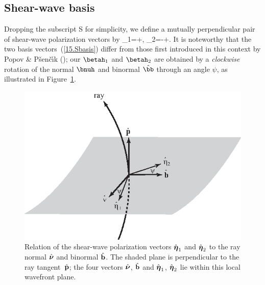 \renewcommand{\thesubsection}{$\!\!\!\raise1.3ex\hbox{$\star$}\!\!$
\arabic{chapter}.\arabic{section}.\arabic{subsection}}
\subsection{Shear-wave basis}
%
%
\renewcommand{\thesubsection}{\arabic{chapter}.\arabic{section}.\arabic{subsection}}

Dropping the subscript S for simplicity, we define a mutually
perpendicular pair of shear-wave polarization vectors by
\eq \label{15.Sbasis}
\betah_1=\bnuh\cos\psi+\hat{\bb}\sin\psi,\qquad
\betah_2=-\bnuh\sin\psi+\hat{\bb}\cos\psi.
\en
It is noteworthy that the two basis vectors~(\ref{15.Sbasis})
differ from those first introduced in this context by
Popov \& P\v{s}en\v{c}\'{\i}k (\citeyear{popov&psencik76});
\vspace{-0.2mm}
our $\betah_1$ and $\betah_2$ are obtained by a
{\em clockwise\/} rotation of the normal $\bnuh$
and binormal $\hat{\bb}$ through an angle $\psi$, as
illustrated in Figure~\ref{15.fig.Spol}.
\begin{figure}
\begin{center}
\includegraphics{../figures/chap15/fig03.eps}
\end{center}
\caption[shear wave basis]
{\label{15.fig.Spol}
Relation of the shear-wave polarization vectors
$\hat{\mbox{\boldmath $\eta$}}_1$ and
$\hat{\mbox{\boldmath $\eta$}}_2$ to
the ray normal $\hat{\mbox{\boldmath $\nu$}}$
and binormal $\hat{\bf b}$.
The shaded plane is perpendicular to the ray tangent~$\hat{\bf p}$;
the four vectors $\hat{\mbox{\boldmath $\nu$}}$, $\hat{\bf b}$
and $\hat{\mbox{\boldmath $\eta$}}_1$,
$\hat{\mbox{\boldmath $\eta$}}_2$
lie within this local wavefront plane.}
\end{figure}
